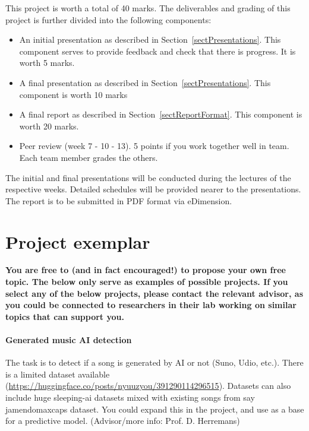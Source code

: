 \documentclass[DIV12, oneside]{scrartcl}
\begin{document}
This project is worth a total of 40 marks. The deliverables and grading of this project is further divided into the following components:
\begin{itemize}
\item An initial presentation as described in Section~\ref{sectPresentations}. This component serves to provide feedback and check that there is progress. It is worth 5 marks.
\item A final presentation as described in Section~\ref{sectPresentations}. This component is worth 10 marks
\item A final report as described in Section~\ref{sectReportFormat}. This component is worth 20 marks. 
\item Peer review (week 7 - 10 - 13). 5 points if you work together well in team. Each team member grades the others. 
\end{itemize}
 
The initial and final presentations will be conducted during the lectures of the respective weeks. Detailed schedules will be provided nearer to the presentations. The report is to be submitted in PDF format via eDimension.
 

 
\section{Project exemplar}
 \textbf{You are free to (and in fact encouraged!) to propose your own free topic. The below only serve as examples of possible projects. If you select any of the below projects, please contact the relevant advisor, as you could be connected to researchers in their lab working on similar topics that can support you. }



\paragraph{Generated music AI detection}
The task is to detect if a song is generated by AI or not (Suno, Udio, etc.). There is a limited dataset available (\url{https://huggingface.co/posts/nyuuzyou/391290114296515}). Datasets can also include huge sleeping-ai datasets mixed with existing songs from say jamendomaxcaps dataset. 
You could expand this in the project, and use as a base for a predictive model. (Advisor/more info: Prof. D. Herremans) 


\end{document}
